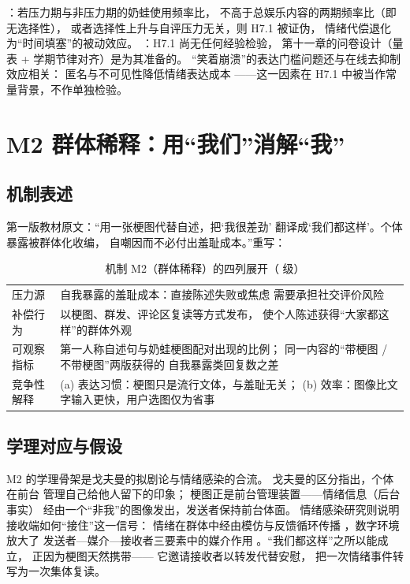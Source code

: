 ：若压力期与非压力期的奶蛙使用频率比，
不高于总娱乐内容的两期频率比（即无选择性），
或者选择性上升与自评压力无关，则 H7.1 被证伪，
情绪代偿退化为“时间填塞”的被动效应。
：H7.1 尚无任何经验检验，
第十一章的问卷设计（量表 + 学期节律对齐）是为其准备的。
“笑着崩溃”的表达门槛问题还与在线去抑制效应相关：
匿名与不可见性降低情绪表达成本
\cite{suler2004disinhibition}——这一因素在
H7.1 中被当作常量背景，不作单独检验。

\section{M2 群体稀释：用“我们”消解“我”}\label{sec:07:m2}

\subsection{机制表述}

第一版教材原文：“用一张梗图代替自述，把‘我很差劲’
翻译成‘我们都这样’。个体暴露被群体化收编，
自嘲因而不必付出羞耻成本。”重写：

\begin{table}[htbp]\centering
  \caption{机制 M2（群体稀释）的四列展开（ 级）}
  \label{tab:07:m2}
  \small
  \begin{tabularx}{\textwidth}{@{}lX@{}}
    \toprule
    压力源 & 自我暴露的羞耻成本：直接陈述失败或焦虑
      需要承担社交评价风险 \\
    补偿行为 & 以梗图、群发、评论区复读等方式发布，
      使个人陈述获得“大家都这样”的群体外观 \\
    可观察指标 & 第一人称自述句与奶蛙梗图配对出现的比例；
      同一内容的“带梗图 / 不带梗图”两版获得的
      自我暴露类回复数之差 \\
    竞争性解释 & (a) 表达习惯：梗图只是流行文体，与羞耻无关；
      (b) 效率：图像比文字输入更快，用户选图仅为省事 \\
    \bottomrule
  \end{tabularx}
\end{table}

\subsection{学理对应与假设}

M2 的学理骨架是戈夫曼的拟剧论与情绪感染的合流。
戈夫曼的区分指出，个体在前台
管理自己给他人留下的印象\cite{goffman1959presentation}；
梗图正是前台管理装置——情绪信息（后台事实）
经由一个“非我”的图像发出，发送者保持前台体面。
情绪感染研究则说明接收端如何“接住”这一信号：
情绪在群体中经由模仿与反馈循环传播
\cite{hatfield1994contagion}，数字环境放大了
发送者—媒介—接收者三要素中的媒介作用
\cite{goldenberg2020digital}。“我们都这样”之所以能成立，
正因为梗图天然携带——
它邀请接收者以转发代替安慰，
把一次情绪事件转写为一次集体复读。

